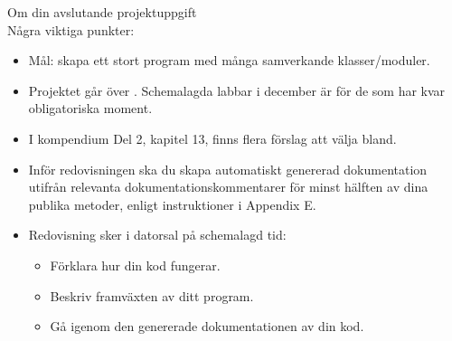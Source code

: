 

  


\begin{Slide}{Om din avslutande projektuppgift}\SlideFontSmall
{} \\
Några viktiga punkter:
\begin{itemize}
\item Mål: skapa ett stort program med många samverkande klasser/moduler.
\item Projektet går över . Schemalagda labbar i december är  för de som har kvar obligatoriska moment.

\item I kompendium Del 2, kapitel 13, finns flera förslag att välja bland.

\item Inför redovisningen ska du skapa automatiskt genererad dokumentation utifrån relevanta dokumentationskommentarer för minst hälften av dina publika metoder, enligt instruktioner i Appendix E.

\item Redovisning sker i datorsal på schemalagd tid:
\begin{itemize}\SlideFontTiny
  \item Förklara hur din kod fungerar.
  \item Beskriv framväxten av ditt program.
  \item Gå igenom den genererade dokumentationen av din kod.
\end{itemize}
\end{itemize}

\end{Slide}

